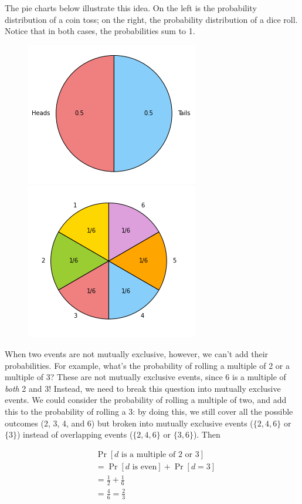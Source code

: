 \documentclass[12 pt]{article}
\newcounter{example}[section]
\begin{document}
The pie charts below illustrate this idea. On the left is the probability 
distribution of a coin toss; on the right, the probability distribution 
of a dice roll. Notice that in both cases, the probabilities sum to 1.

\begin{figure}[h]
    \includegraphics[width=.5\linewidth]{imgs/coin-pie.png}
    \includegraphics[width=.5\linewidth]{imgs/die-pie.png}
    \label{fig:pies}
  \end{figure}

When two events are not mutually exclusive, however, we can't add 
their probabilities. For example, what's the probability of rolling a 
multiple of 2 or a multiple of 3? These are not mutually exclusive
events, since 6 is a multiple of \emph{both} 2 and 3! Instead, we need 
to break this question into mutually exclusive events. We could consider 
the probability of rolling a multiple of two, and add this to the 
probability of rolling a 3: by doing this, we still cover all the 
possible outcomes (2, 3, 4, and 6) but broken into mutually exclusive 
events ($\{2,4,6\}$ or $\{3\}$) instead of overlapping events ($\{2, 4, 
6\}$ or $\{3, 6\}$). Then

\begin{align*}
    &\Pr[d \text{ is a multiple of 2 or 3}] \\
    &= \Pr[d \text{ is even}] + \Pr[d=3]\\
    &= \frac{1}{2} + \frac{1}{6}\\
    &= \frac{4}{6} = \frac{2}{3}
\end{align*}
\end{document}

